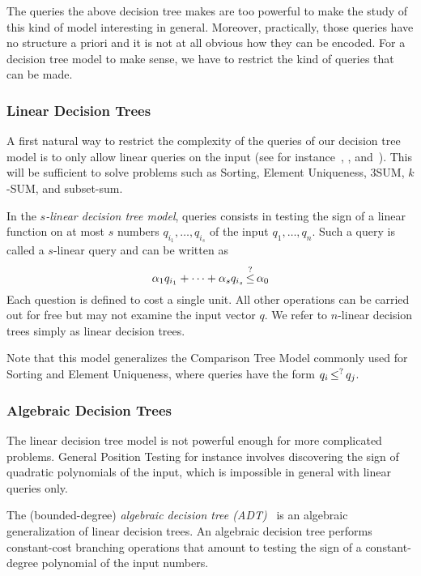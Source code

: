 The queries the above decision tree makes are too powerful to make the study of
this kind of model interesting in general.
%
Moreover, practically, those queries have no structure a priori and it is not at
all obvious how they can be encoded.
%
For a decision tree model to make sense, we have to restrict the kind of
queries that can be made.

\subsubsection{Linear Decision Trees}

A first natural way to restrict the complexity of the queries of our decision
tree model is to only allow linear queries on the input
(see for instance~\cite[Section~1]{Dob76},
\cite[Section~2]{DL78}, and~\cite[Section~4]{DL79}).
This will be sufficient to solve problems such as Sorting, Element Uniqueness,
3SUM, \(k\)-SUM, and subset-sum.

In the \emph{\(s\)-linear decision tree model}, queries consists
in testing the sign of a linear function on at most \(s\) numbers \(q_{i_1},\ldots,q_{i_s}\) of the
input \(q_1,\ldots,q_n\). Such a query is called a \(s\)-linear query and
can be written as
%
\begin{displaymath}
	\alpha_1 q_{i_1} + \cdots + \alpha_s q_{i_s} \mathop{\leq}^{?} \alpha_0
\end{displaymath}
%
Each question is defined to cost a single unit. All other operations can be
carried out for free but may not examine the input vector $q$. We refer to
$n$-linear decision trees simply as linear decision trees.

Note that this model generalizes the Comparison Tree Model commonly used for
Sorting and Element Uniqueness, where queries have the form \(q_i \mathop{\leq}^{?}
q_j\).

\subsubsection{Algebraic Decision Trees}
The linear decision tree model is not powerful enough for more complicated
problems. General Position Testing for instance involves discovering the sign
of quadratic polynomials of the input, which is impossible in general with
linear queries only.

The (bounded-degree) \emph{algebraic decision tree (ADT)}~\cite{R72,Y81,SY82}
is an algebraic generalization of linear decision trees.
An algebraic decision tree performs constant-cost branching operations that
amount to testing the sign of
a constant-degree polynomial of the input numbers.

